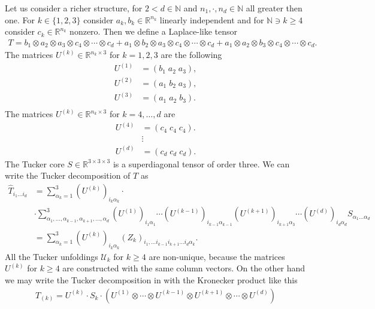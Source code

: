 \documentclass[a4paper]{article}
\begin{document}
Let us consider a richer structure, for $2<d \in \mathbb{N}$ and $n_1, \cdot
,n_d\in \mathbb{N}$ all greater then one. For $k \in \{1, 2, 3\}$ consider
$a_k, b_k \in \mathbb{R}^{n_k}$ linearly independent and for $\mathbb{N} \ni
k \geq 4$ consider $c_k\in \mathbb{R}^{n_k}$ nonzero. Then we define a
Laplace-like tensor
\begin{align}
    T = b_1 \otimes a_2 \otimes a_3 \otimes c_4\otimes \cdots \otimes c_d
+a_1 \otimes b_2 \otimes a_3 \otimes c_4\otimes \cdots \otimes c_d
+a_1 \otimes a_2 \otimes b_3 \otimes c_4\otimes \cdots \otimes c_d.
\end{align}
The matrices $U^{(k)} \in \mathbb{R}^{n_k \times 3}$ for $k= 1, 2 ,3$ are the
following
\begin{align}
    U^{(1)} &= (b_1\; a_2\; a_3),\\
    U^{(2)} &= (a_1\; b_2\; a_3),\\
    U^{(3)} &= (a_1\; a_2\; b_3).\\
\end{align}
The matrices $U^{(k)} \in \mathbb{R}^{n_k \times 3}$ for $k = 4, \dots, d$
are
\begin{align}
    U^{(4)} &= (c_4\; c_4\; c_4).\\
            &\vdots\nonumber\\
    U^{(d)} &= (c_d\; c_d\; c_d).
\end{align}
The Tucker core $S \in \mathbb{R}^{3\times 3\times3}$ is a superdiagonal
tensor of order three. We can write the Tucker decomposition of $T$ as
\begin{align}
    \hat{T}_{i_1\dots i_d} &=
    \sum_{\alpha_k = 1}^3 (U^{(k)})_{i_k\alpha_k}\cdot\nonumber
\\&\cdot\sum_{\alpha_1,\dots,\alpha_{k-1},\alpha_{k+1},\dots, \alpha_d}^3
       (U^{(1)})_{i_1\alpha_1}\cdots(U^{(k-1)})_{i_{k-1}\alpha_{k-1}}
    (U^{(k+1)})_{i_{k+1}\alpha_3}\cdots(U^{(d)})_{i_d\alpha_d}
    S_{\alpha_1 \dots \alpha_d}\\
       &= \sum_{\alpha_k = 1}^3 (U^{(k)})_{i_k\alpha_k} (Z_{k})_{i_1,\dots
       i_{k-1}i_{k+1}\dots i_d \alpha_k}.
\end{align}
All the Tucker unfoldings $\mathcal{U}_{k}$ for $k\geq 4$ are non-unique,
because the matrices $U^{(k)}$ for $k \geq 4$ are constructed with the same
column vectors. On the other hand we may write the Tucker decomposition in
with the Kronecker product like this
\begin{align}
    T_{(k)} =U^{(k)} \cdot S_k \cdot (U^{(1)}\otimes\cdots\otimes
    U^{(k-1)}\otimes U^{(k+1)}\otimes \cdots \otimes U^{(d)})
\end{align}

\printbibliography
\end{document}
